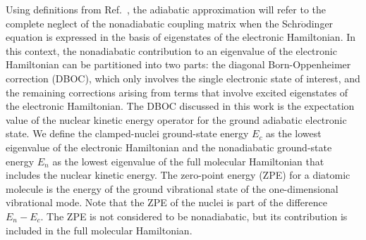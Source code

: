 \documentclass[aip,jcp,numerical,reprint]{revtex4-1}
\begin{document}
Using definitions from Ref.~\cite{Cederbaum_Review}, the adiabatic approximation will refer to the complete neglect of the nonadiabatic coupling matrix when the Schr$\ddot{\text{o}}$dinger equation is expressed in the basis of eigenstates of the electronic Hamiltonian. In this context, the nonadiabatic contribution to an eigenvalue of the electronic Hamiltonian can be partitioned into two parts: the diagonal Born-Oppenheimer correction (DBOC), which only involves the single electronic state of interest, and the remaining corrections arising from terms that involve excited eigenstates of the electronic Hamiltonian. The DBOC discussed in this work is the expectation value of the nuclear kinetic energy operator for the ground adiabatic electronic state. We define the clamped-nuclei ground-state energy $E_c$ as the lowest eigenvalue of the electronic Hamiltonian and the nonadiabatic ground-state energy $E_n$ as the lowest eigenvalue of the full molecular Hamiltonian that includes the nuclear kinetic energy. The zero-point energy (ZPE) for a diatomic molecule is the energy of the ground vibrational state of the one-dimensional vibrational mode. Note that the ZPE of the nuclei is part of the difference $E_n-E_c$. The ZPE is not considered to be nonadiabatic, but its contribution is included in the full molecular Hamiltonian.
\end{document}
